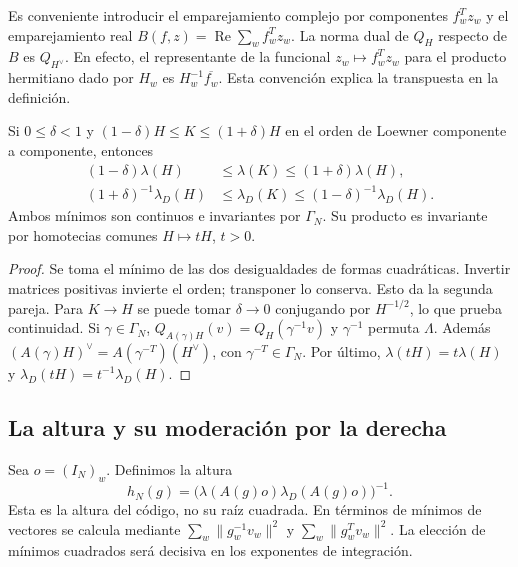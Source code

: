 Es conveniente introducir el emparejamiento complejo por componentes $f_w^Tz_w$ y el emparejamiento real $B(f,z)=\operatorname{Re}\sum_w f_w^Tz_w$. La norma dual de $Q_H$ respecto de $B$ es $Q_{H^\vee}$. En efecto, el representante de la funcional $z_w\mapsto f_w^Tz_w$ para el producto hermitiano dado por $H_w$ es $H_w^{-1}\overline{f_w}$. Esta convención explica la transpuesta en la definición.

\begin{lema}
\label{lem:ahr-min}
Si $0\le\delta<1$ y $(1-\delta)H\le K\le(1+\delta)H$ en el orden de Loewner componente a componente, entonces
\begin{equation}
 \begin{split}
 (1-\delta)\lambda(H)&\le\lambda(K)\le(1+\delta)\lambda(H),\\
 (1+\delta)^{-1}\lambda_D(H)&\le\lambda_D(K)
       \le(1-\delta)^{-1}\lambda_D(H).
 \end{split}
 \label{eq:ahr-min-compara}
\end{equation}
Ambos mínimos son continuos e invariantes por $\Gamma_N$. Su producto es invariante por homotecias comunes $H\mapsto tH$, $t>0$.
\end{lema}
\begin{proof}
Se toma el mínimo de las dos desigualdades de formas cuadráticas. Invertir matrices positivas invierte el orden; transponer lo conserva. Esto da la segunda pareja. Para $K\to H$ se puede tomar $\delta\to0$ conjugando por $H^{-1/2}$, lo que prueba continuidad. Si $\gamma\in\Gamma_N$, $Q_{A(\gamma)H}(v)=Q_H(\gamma^{-1}v)$ y $\gamma^{-1}$ permuta $\Lambda$. Además $(A(\gamma)H)^\vee=A(\gamma^{-T})(H^\vee)$, con $\gamma^{-T}\in\Gamma_N$. Por último, $\lambda(tH)=t\lambda(H)$ y $\lambda_D(tH)=t^{-1}\lambda_D(H)$.
\end{proof}

\subsection{La altura y su moderación por la derecha}

Sea $o=(I_N)_w$. Definimos la altura
\begin{equation}
 h_N(g)=\bigl(\lambda(A(g)o)\lambda_D(A(g)o)\bigr)^{-1}.
 \label{eq:ahr-altura}
\end{equation}
Esta es la altura del código, no su raíz cuadrada. En términos de mínimos de vectores se calcula mediante $\sum_w\|g_w^{-1}v_w\|^2$ y $\sum_w\|g_w^Tv_w\|^2$. La elección de mínimos cuadrados será decisiva en los exponentes de integración.

